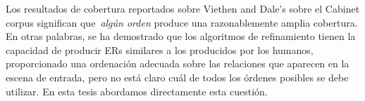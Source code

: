 Los resultados de cobertura reportados sobre Viethen and 
Dale's sobre el Cabinet corpus significan que~\emph{alg\'un orden} produce una razonablemente amplia cobertura. En otras palabras, se ha demostrado que los algoritmos de refinamiento tienen la capacidad de producir ERs similares a los producidos por los humanos, proporcionado una ordenaci\'on adecuada sobre las relaciones que aparecen
en la escena de entrada, pero no est\'a claro cu\'al de todos los \'ordenes posibles se debe utilizar. En esta tesis abordamos directamente esta cuesti\'on.



